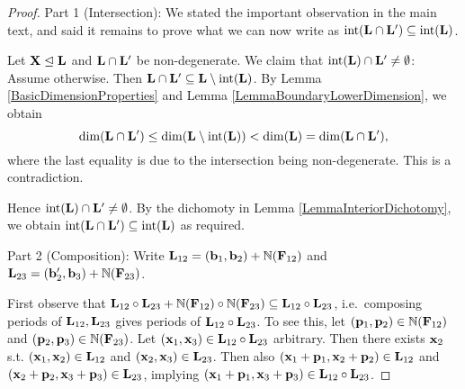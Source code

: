 \begin{proof}
Part 1 (Intersection): We stated the important observation in the main text, and said it remains to prove what we can now write as \(\operatorname{int}(\mathbf{L} \cap \mathbf{L}') \subseteq \operatorname{int}(\mathbf{L})\).

Let \(\mathbf{X} \trianglelefteq \mathbf{L}\) and \(\mathbf{L} \cap \mathbf{L}'\) be non-degenerate. We claim that \(\operatorname{int}(\mathbf{L}) \cap \mathbf{L}'\neq \emptyset\): Assume otherwise. Then \(\mathbf{L} \cap \mathbf{L}' \subseteq \mathbf{L} \setminus \operatorname{int}(\mathbf{L})\). By Lemma \ref{BasicDimensionProperties} and Lemma \ref{LemmaBoundaryLowerDimension}, we obtain 
\[\dim(\mathbf{L} \cap \mathbf{L}') \leq \dim(\mathbf{L} \setminus \operatorname{int}(\mathbf{L}))<\dim(\mathbf{L})=\dim(\mathbf{L} \cap \mathbf{L}'),\]
where the last equality is due to the intersection being non-degenerate. This is a contradiction.

Hence \(\operatorname{int}(\mathbf{L}) \cap \mathbf{L}' \neq \emptyset\). By the dichomoty in Lemma \ref{LemmaInteriorDichotomy}, we obtain \(\operatorname{int}(\mathbf{L} \cap \mathbf{L}') \subseteq \operatorname{int}(\mathbf{L})\) as required.

Part 2 (Composition): Write \(\mathbf{L}_{12}=(\mathbf{b}_1, \mathbf{b}_2)+\mathbb{N}(\mathbf{F}_{12})\) and \(\mathbf{L}_{23}=(\mathbf{b}_2', \mathbf{b}_3)+\mathbb{N}(\mathbf{F}_{23})\). 

First observe that \(\mathbf{L}_{12} \circ \mathbf{L}_{23}+\mathbb{N}(\mathbf{F}_{12}) \circ \mathbb{N}(\mathbf{F}_{23})\subseteq \mathbf{L}_{12} \circ \mathbf{L}_{23}\), i.e.\ composing periods of \(\mathbf{L}_{12}, \mathbf{L}_{23}\) gives periods of \(\mathbf{L}_{12} \circ \mathbf{L}_{23}\). To see this, let \((\mathbf{p}_1, \mathbf{p}_2) \in \mathbb{N}(\mathbf{F}_{12})\) and \((\mathbf{p}_2, \mathbf{p}_3) \in \mathbb{N}(\mathbf{F}_{23})\). Let \((\mathbf{x}_1, \mathbf{x}_3) \in \mathbf{L}_{12} \circ \mathbf{L}_{23}\) arbitrary. Then there exists \(\mathbf{x}_2\) s.t. \((\mathbf{x}_1, \mathbf{x}_2) \in \mathbf{L}_{12}\) and \((\mathbf{x}_2, \mathbf{x}_3) \in \mathbf{L}_{23}\). Then also \((\mathbf{x}_1+\mathbf{p}_1, \mathbf{x}_2+\mathbf{p}_2) \in \mathbf{L}_{12}\) and \((\mathbf{x}_2+\mathbf{p}_2, \mathbf{x}_3+\mathbf{p}_3) \in \mathbf{L}_{23}\), implying \((\mathbf{x}_1+\mathbf{p}_1, \mathbf{x}_3+\mathbf{p}_3) \in \mathbf{L}_{12} \circ \mathbf{L}_{23}\). 


\end{proof}
